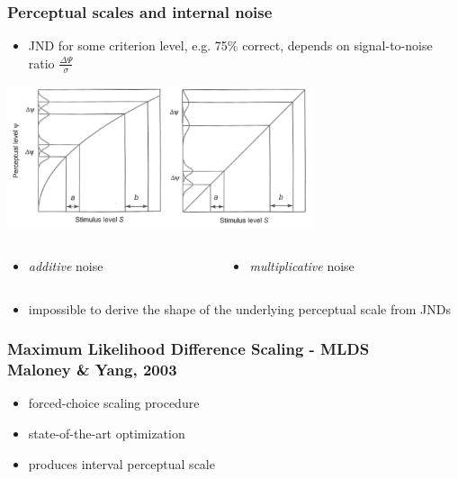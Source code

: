 \documentclass[]{beamer}
\begin{document}
\begin{frame}
 \frametitle{Perceptual scales and internal noise}
\begin{overlayarea}{110mm}{90mm}
\begin{itemize}
 \item JND for some criterion level, e.g. 75\% correct, depends on signal-to-noise ratio $\frac{\Delta\Psi}{\sigma}$
\end{itemize}

\begin{center}
  \includegraphics[width=90mm]{figs/l6/additive_noise.png}
\end{center}

\begin{columns}[T]
 \begin{column}{35mm}
\begin{itemize}
 \item \textit{additive}  noise
\end{itemize}
   \end{column}
 \begin{column}{40mm}
 \begin{itemize}
 \item \textit{multiplicative} noise 
 \end{itemize}
 \end{column}
\end{columns}
\begin{itemize}
 \item<2->[$\Rightarrow$] impossible to derive the shape of the underlying perceptual scale from JNDs
\end{itemize}
\end{overlayarea}
\end{frame}



\begin{frame}
 \frametitle{Maximum Likelihood Difference Scaling - MLDS \\ \scriptsize{Maloney \& Yang, 2003}}
 
\normalsize
\begin{itemize}
 \item forced-choice scaling procedure
 \item state-of-the-art optimization
 \item produces interval perceptual scale
\end{itemize}
\end{frame}
\end{document}
